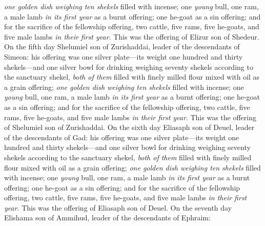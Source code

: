 \begin{biblechapter}
\verse \textit{one golden dish weighing ten shekels} filled with incense;
\verse one \textit{young} bull, one ram, a male lamb \textit{in its first year} as a burnt offering;
\verse one he-goat as a sin offering;
\verse and for the sacrifice of the fellowship offering, two cattle, five rams, five he-goats, and five male lambs \textit{in their first year}. This was the offering of Elizur son of Shedeur.
\verse On the fifth day Shelumiel son of Zurishaddai, leader of the descendants of Simeon:
\verse his offering was one silver plate—its weight one hundred and thirty shekels—and one silver bowl for drinking weighing seventy shekels according to the sanctuary shekel, \textit{both of them} filled with finely milled flour mixed with oil as a grain offering;
\verse \textit{one golden dish weighing ten shekels} filled with incense;
\verse one \textit{young} bull, one ram, a male lamb \textit{in its first year} as a burnt offering;
\verse one he-goat as a sin offering;
\verse and for the sacrifice of the fellowship offering, two cattle, five rams, five he-goats, and five male lambs \textit{in their first year}. This was the offering of Shelumiel son of Zurishaddai.
\verse On the sixth day Eliasaph son of Deuel, leader of the descendants of Gad:
\verse his offering was one silver plate—its weight one hundred and thirty shekels—and one silver bowl for drinking weighing seventy shekels according to the sanctuary shekel, \textit{both of them} filled with finely milled flour mixed with oil as a grain offering;
\verse \textit{one golden dish weighing ten shekels} filled with incense;
\verse one \textit{young} bull, one ram, a male lamb \textit{in its first year} as a burnt offering;
\verse one he-goat as a sin offering;
\verse and for the sacrifice of the fellowship offering, two cattle, five rams, five he-goats, and five male lambs \textit{in their first year}. This was the offering of Eliasaph son of Deuel.
\verse On the seventh day Elishama son of Ammihud, leader of the descendants of Ephraim:

\end{biblechapter}
